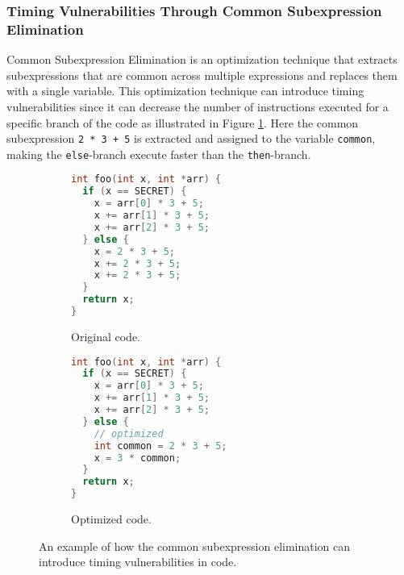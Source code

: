 \subsubsection{Timing Vulnerabilities Through Common Subexpression Elimination}
\label{sec:cse}
Common Subexpression Elimination is an optimization technique that extracts subexpressions that are common across multiple expressions and replaces them with a single variable.
This optimization technique can introduce timing vulnerabilities since it can decrease the number of instructions executed for a specific branch of the code as illustrated in Figure \ref{fig:common-subexpression-elimination}.
Here the common subexpression \texttt{2 * 3 + 5} is extracted and assigned to the variable \texttt{common}, making the \texttt{else}-branch execute faster than the \texttt{then}-branch.

\begin{figure}[H]
  \centering
     \begin{subfigure}[b]{0.3\textwidth}
        \begin{lstlisting}[style=defstyle, language=C, basicstyle=\footnotesize\ttfamily,breaklines=true]
int foo(int x, int *arr) {
  if (x == SECRET) {
    x = arr[0] * 3 + 5;
    x += arr[1] * 3 + 5;
    x += arr[2] * 3 + 5;
  } else {
    x = 2 * 3 + 5;
    x += 2 * 3 + 5;
    x += 2 * 3 + 5;
  }
  return x;
} \end{lstlisting} 
         \caption{Original code.}
    \end{subfigure}
    \hspace{1cm}
    \begin{subfigure}[b]{0.3\textwidth}
      \begin{lstlisting}[style=defstyle, language=C, basicstyle=\footnotesize\ttfamily,breaklines=true]
int foo(int x, int *arr) {
  if (x == SECRET) {
    x = arr[0] * 3 + 5;
    x += arr[1] * 3 + 5;
    x += arr[2] * 3 + 5;
  } else {
    // optimized
    int common = 2 * 3 + 5;
    x = 3 * common;
  }
  return x;
} \end{lstlisting} 
       \caption{Optimized code.}
  \end{subfigure}
  \caption{An example of how the common subexpression elimination can introduce timing vulnerabilities in code.}
  \label{fig:common-subexpression-elimination}
\end{figure}